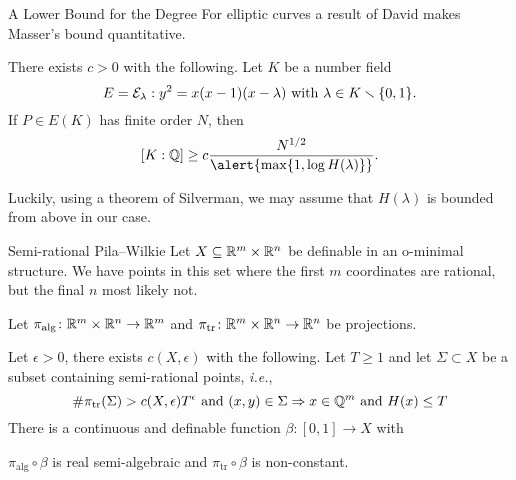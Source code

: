 \documentclass{beamer}
\begin{document}
\begin{frame}{A Lower Bound for the Degree}
  For elliptic curves a result of David makes Masser's bound quantitative.
  
  \begin{theorem}[David]
    There exists $c>0$ with the following. 
    Let $K$ be a number field
    $$E={\mathcal E}_\lambda: y^2=x(x-1)(x-\lambda)    \text{ with }
    \lambda\in K\smallsetminus\{0,1\}.$$
    If $P\in
    E(K)$ has finite order $N$, then
    \begin{equation}
      \label{eq:davidKQlb}
      [K:\IQ] \ge c \frac{N^{1/2}}{\alert{\max\{1,\log H(\lambda)\}}}.
    \end{equation}    
  \end{theorem}

  Luckily, using a theorem of \alert{Silverman}, we may assume that
  $H(\lambda)$ is bounded from above in our case.
  

\end{frame}


\begin{frame}{Semi-rational Pila--Wilkie}
  Let $X\subseteq {\mathbb{R}}^m\times{\mathbb{R}}^n$
  be definable in an o-minimal structure. 
  We have points in this set where the
  first $m$ coordinates are rational, but the final $n$ most likely not.

  Let $\pi_{\mathrm{alg}}\colon{\mathbb{R}}^m\times{\mathbb{R}}^n\rightarrow{\mathbb{R}}^m$ and
  $\pi_{\mathrm{tr}}\colon{\mathbb{R}}^m\times{\mathbb{R}}^n\rightarrow{\mathbb{R}}^n$ be projections.

  \begin{theorem}
    Let $\epsilon>0$, there exists $c(X,\epsilon)$ with the following. 
    Let $T\ge 1$ and let $\Sigma\subset X$ be a subset containing
    \alert{semi-rational points}, \textit{i.e.},
    $$
    \#\pi_{\mathrm{tr}}(\Sigma) > c(X,\epsilon) T^\epsilon \text{ and }
    (x,y)\in\Sigma\Rightarrow x\in {\mathbb{Q}}^m \text{ and }H(x)\le T
    $$  
    There is a continuous and definable function $\beta\colon
    [0,1]\rightarrow X$ with
    \begin{center}
      $\pi_{\mathrm{alg}}\circ\beta$ is real semi-algebraic and
      $\pi_{\mathrm{tr}}\circ\beta$ is non-constant.  
    \end{center}  
  \end{theorem}
\end{frame}
\end{document}
